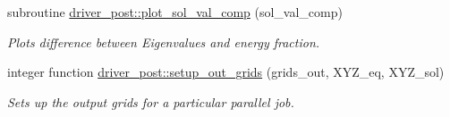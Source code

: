 \begin{DoxyCompactItemize}
subroutine \hyperlink{namespacedriver__post_af9ce961d2d6825b767a93fdbe8806a1c}{driver\+\_\+post\+::plot\+\_\+sol\+\_\+val\+\_\+comp} (sol\+\_\+val\+\_\+comp)
\begin{DoxyCompactList}\small\item\em Plots difference between Eigenvalues and energy fraction. \end{DoxyCompactList}\item 
integer function \hyperlink{namespacedriver__post_a3438685c5fb7302f756c368fb5f940ee}{driver\+\_\+post\+::setup\+\_\+out\+\_\+grids} (grids\+\_\+out, X\+Y\+Z\+\_\+eq, X\+Y\+Z\+\_\+sol)
\begin{DoxyCompactList}\small\item\em Sets up the output grids for a particular parallel job. \end{DoxyCompactList}\end{DoxyCompactItemize}
